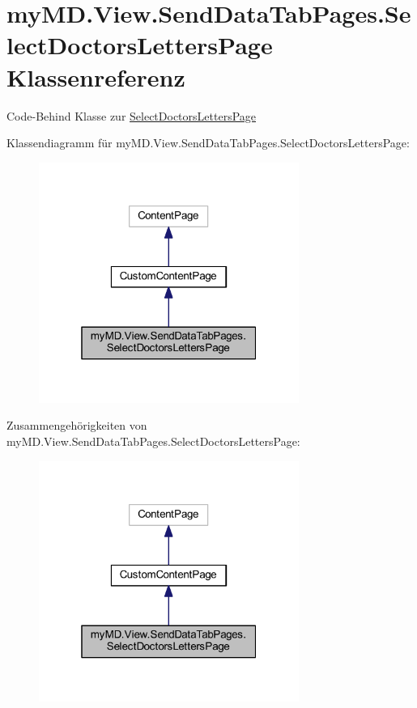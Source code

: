 \hypertarget{classmy_m_d_1_1_view_1_1_send_data_tab_pages_1_1_select_doctors_letters_page}{}\section{my\+M\+D.\+View.\+Send\+Data\+Tab\+Pages.\+Select\+Doctors\+Letters\+Page Klassenreferenz}
\label{classmy_m_d_1_1_view_1_1_send_data_tab_pages_1_1_select_doctors_letters_page}


Code-\/\+Behind Klasse zur \mbox{\hyperlink{classmy_m_d_1_1_view_1_1_send_data_tab_pages_1_1_select_doctors_letters_page}{Select\+Doctors\+Letters\+Page}}  




Klassendiagramm für my\+M\+D.\+View.\+Send\+Data\+Tab\+Pages.\+Select\+Doctors\+Letters\+Page\+:
\nopagebreak
\begin{figure}[H]
\begin{center}
\leavevmode
\includegraphics[width=241pt]{classmy_m_d_1_1_view_1_1_send_data_tab_pages_1_1_select_doctors_letters_page__inherit__graph}
\end{center}
\end{figure}


Zusammengehörigkeiten von my\+M\+D.\+View.\+Send\+Data\+Tab\+Pages.\+Select\+Doctors\+Letters\+Page\+:
\nopagebreak
\begin{figure}[H]
\begin{center}
\leavevmode
\includegraphics[width=241pt]{classmy_m_d_1_1_view_1_1_send_data_tab_pages_1_1_select_doctors_letters_page__coll__graph}
\end{center}
\end{figure}
